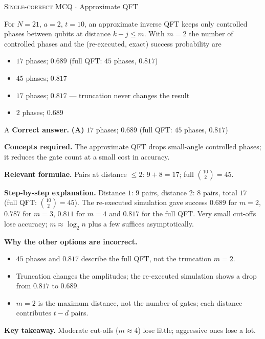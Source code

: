 \documentclass[11pt,a4paper]{article}
\newcommand{\optlabel}[1]{\textbf{(#1)}}
\newcommand{\correctlabel}[1]{\textcolor{okgreen}{\textbf{(#1)}\,\ding{51}}}
\newenvironment{qitem}[1]{\begin{list}{}{\setlength{\leftmargin}{3.3em}\setlength{\labelwidth}{3.1em}%
  \setlength{\labelsep}{0.2em}\setlength{\topsep}{3pt}\setlength{\parsep}{3pt}}\item[\textbf{Q.#1}\hfill]}{\end{list}}
\newcommand{\qsep}{\par\vspace{2pt}{\color{black!15}\hrule}\vspace{4pt}}
\newcommand{\qmeta}[2]{{\footnotesize\color{black!60}\textsc{#1} \;$\cdot$\; #2}\par}
\begin{document}
\begin{qitem}{65}
\qmeta{Single-correct MCQ}{Approximate QFT}
For $N = 21$, $a = 2$, $t = 10$, an approximate inverse QFT keeps only controlled phases between qubits at distance $k - j \le m$. With $m = 2$ the
number of controlled phases and the (re-executed, exact) success probability are
\begin{itemize}[leftmargin=2.6em, labelsep=0.4em, itemsep=2pt, topsep=3pt]
\item[\correctlabel{A}] $17$ phases; $0.689$ (full QFT: $45$ phases, $0.817$)
\item[\optlabel{B}] $45$ phases; $0.817$
\item[\optlabel{C}] $17$ phases; $0.817$ --- truncation never changes the result
\item[\optlabel{D}] $2$ phases; $0.689$
\end{itemize}
\end{qitem}
\begin{solbox}{A}
\textbf{\color{brand}Correct answer.} \textcolor{okgreen}{\textbf{(A)}} $17$ phases; $0.689$ (full QFT: $45$ phases, $0.817$)

\textbf{\color{brand}Concepts required.} The approximate QFT drops small-angle controlled phases; it reduces the gate count at a small cost in accuracy.

\textbf{\color{brand}Relevant formulae.} Pairs at distance $\le2$: $9 + 8 = 17$; full $\binom{10}{2} = 45$.

\textbf{\color{brand}Step-by-step explanation.} Distance $1$: $9$ pairs, distance $2$: $8$ pairs, total $17$ (full QFT: $\binom{10}{2} = 45$). The re-executed simulation gave success $0.689$ for $m = 2$, $0.787$ for $m = 3$,
$0.811$ for $m = 4$ and $0.817$ for the full QFT. Very small cut-offs lose accuracy; $m \approx \log_2 n$ plus a few suffices asymptotically.

\textbf{\color{brand}Why the other options are incorrect.}
\begin{itemize}[leftmargin=2.4em, itemsep=1pt, topsep=2pt]
\item[\textbf{(B)}] $45$ phases and $0.817$ describe the full QFT, not the truncation $m = 2$.
\item[\textbf{(C)}] Truncation changes the amplitudes; the re-executed simulation shows a drop from $0.817$ to $0.689$.
\item[\textbf{(D)}] $m = 2$ is the maximum distance, not the number of gates; each distance contributes $t - d$ pairs.
\end{itemize}
\textbf{\color{brand}Key takeaway.} Moderate cut-offs ($m \approx 4$) lose little; aggressive ones lose a lot.
\end{solbox}
\qsep
\end{document}
